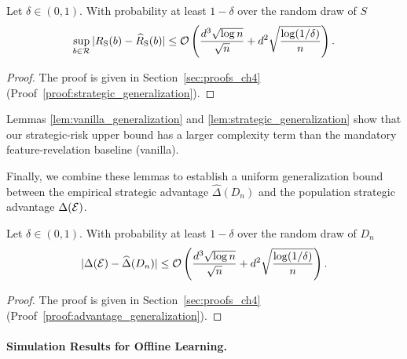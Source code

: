 \begin{lemma}
\label{lem:strategic_generalization}
Let $\delta \in (0, 1)$. With probability at least $1 - \delta$ over the random draw of $S$
\begin{equation*}
    \sup_{b \in \mathcal{R}} |R_{\mathrm{S}}(b) - \widehat{R}_{\mathrm{S}}(b)| \le \mathcal{O}\left( \frac{d^3 \sqrt{\log n}}{\sqrt{n}} + d^2 \sqrt{\frac{\log(1/\delta)}{n}} \right).
\end{equation*}
\end{lemma}
\begin{proof} The proof is given in Section~\ref{sec:proofs_ch4} (Proof~\ref{proof:strategic_generalization}).
\end{proof}
Lemmas \ref{lem:vanilla_generalization} and \ref{lem:strategic_generalization} show that our strategic-risk upper bound has a larger complexity term than the mandatory feature-revelation baseline (vanilla).

Finally, we combine these lemmas to establish a uniform generalization bound between the empirical strategic advantage $\widehat{\Delta}(D_n)$ and the population strategic advantage $\Delta(\mathcal{E})$.

\begin{theorem}\label{thm:advantage_generalization}
Let $\delta \in (0, 1)$. With probability at least $1 - \delta$ over the random draw of $D_n$
\begin{equation*}
    |\Delta(\mathcal{E}) - \widehat{\Delta}(D_n)| \le \mathcal{O}\left( \frac{d^3 \sqrt{\log n}}{\sqrt{n}} + d^2 \sqrt{\frac{\log(1/\delta)}{n}} \right).
\end{equation*}
\end{theorem}
\begin{proof} The proof is given in Section~\ref{sec:proofs_ch4} (Proof~\ref{proof:advantage_generalization}).
\end{proof}

\paragraph{Simulation Results for Offline Learning.}


